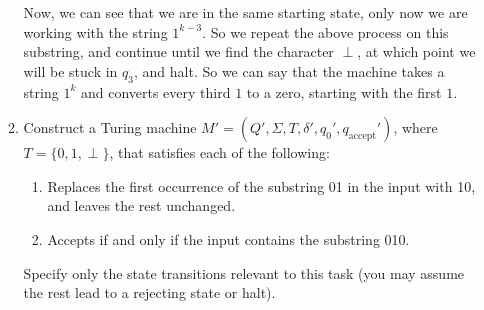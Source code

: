 \documentclass{article}
\begin{document}
\begin{enumerate}
\begin{enumerate}
\begin{center}
                    \end{center}
                    Now, we can see that we are in the same starting state, only now we are working with the string $1^{k-3}$. So we repeat the above process on this substring, and continue until we find the character $\perp $, at which point we will be stuck in $q_3$, and halt. So we can say that the machine takes a string $1^{k}$ and converts every third $1$ to a zero, starting with the first $1$.
                    \newpage
        \item Construct a Turing machine $M'=(Q',\Sigma,T,\delta',q_0',q_{\text{accept}}')$, where $T=\{0,1,\perp \} $, that satisfies each of the following: 
            \begin{enumerate}
                \item Replaces the first occurrence of the substring 01 in the input with 10, and leaves the rest unchanged.
                \item Accepts if and only if the input contains the substring 010. 
            \end{enumerate}
        Specify only the state transitions relevant to this task (you may assume the rest lead to a rejecting state or halt).

\end{enumerate}
\end{enumerate}
\end{document}
